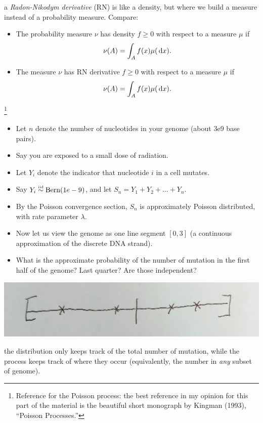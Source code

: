 \documentclass{article}
\begin{document}
 a \emph{Radon-Nikodym derivative} (RN) is like a density, but where we build a measure instead of a probability measure. Compare:
\begin{itemize} 
  \item The probability measure $\nu$ has density $f \ge 0$ with respect to a measure $\mu$ if \[ \nu(A) = \int_A f(x) \mu(\,\mathrm{d} x). \]
  \item The measure $\nu$ has RN derivative $f \ge 0$ with respect to a measure $\mu$ if \[ \nu(A) = \int_A f(x) \mu(\,\mathrm{d} x). \]
\end{itemize}

\footnote{Reference for the Poisson process: the best reference in my opinion for this part of the material is the beautiful short monograph by Kingman (1993), ``Poisson Processes.''}  
\begin{itemize}
  \item Let $n$ denote the number of nucleotides in your genome (about 3e9 base pairs). 
  \item Say you are exposed to a small dose of radiation. 
  \item Let $Y_i$ denote the indicator that nucleotide $i$ in a cell mutates. 
  \item Say $Y_i \stackrel{\scriptscriptstyle \textrm{iid}}{\sim} \operatorname{Bern}(1e-9)$, and let $S_n = Y_1 + Y_2 + \dots + Y_n$.  
  \item By the Poisson convergence section, $S_n$ is approximately Poisson distributed, with rate parameter $\lambda$.
  \item Now let us view the genome as one line segment $[0, 3]$ (a continuous approximation of the discrete DNA strand). 
  \item What is the approximate probability of the number of mutation in the first half of the genome? Last quarter? Are those independent?
\end{itemize}
\begin{center}
	\includegraphics[width=0.5\linewidth]{figures/pp-genome} 
\end{center}

 the distribution only keeps track of the total number of mutation, while the process keeps track of where they occur (equivalently, the number in \emph{any} subset of genome).
\end{document}
